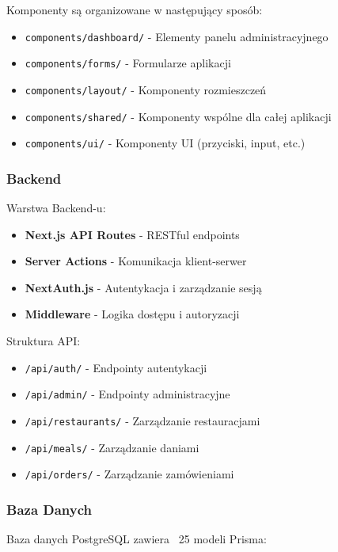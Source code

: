 ﻿\documentclass[12pt,a4paper,utf-8]{article}
\begin{document}
Komponenty są organizowane w następujący sposób:
\begin{itemize}
    \item \texttt{components/dashboard/}  -  Elementy panelu administracyjnego
    \item \texttt{components/forms/}  -  Formularze aplikacji
    \item \texttt{components/layout/}  -  Komponenty rozmieszczeń
    \item \texttt{components/shared/}  -  Komponenty wspólne dla całej aplikacji
    \item \texttt{components/ui/}  -  Komponenty UI (przyciski, input, etc.)
\end{itemize}

\subsubsection{Backend}

Warstwa Backend-u:
\begin{itemize}
    \item \textbf{Next.js API Routes}  -  RESTful endpoints
    \item \textbf{Server Actions}  -  Komunikacja klient-serwer
    \item \textbf{NextAuth.js}  -  Autentykacja i zarządzanie sesją
    \item \textbf{Middleware}  -  Logika dostępu i autoryzacji
\end{itemize}

Struktura API:
\begin{itemize}
    \item \texttt{/api/auth/}  -  Endpointy autentykacji
    \item \texttt{/api/admin/}  -  Endpointy administracyjne
    \item \texttt{/api/restaurants/}  -  Zarządzanie restauracjami
    \item \texttt{/api/meals/}  -  Zarządzanie daniami
    \item \texttt{/api/orders/}  -  Zarządzanie zamówieniami
\end{itemize}

\subsubsection{Baza Danych}

Baza danych PostgreSQL zawiera ~25 modeli Prisma:
\end{document}
